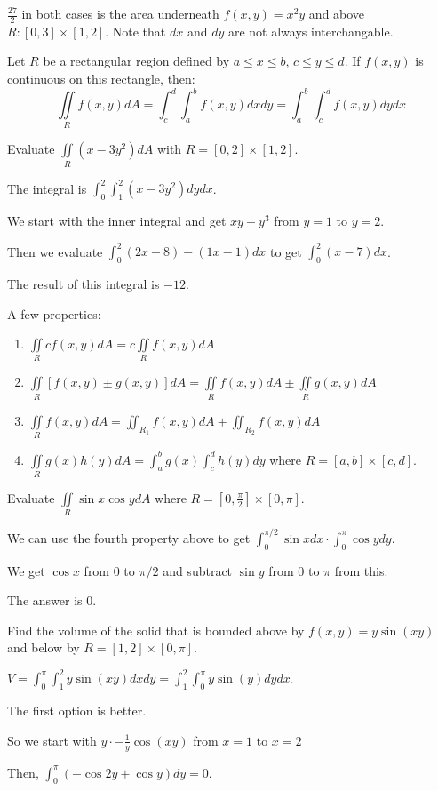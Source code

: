 \documentclass[../calc3.tex]{subfiles}
\begin{document}
$\frac{27}{2}$ in both cases is the area underneath $f(x,y)=x^2y$ and above $R:[0,3]\times [1,2]$. Note that $dx$ and $dy$ are not always interchangable.

\pagebreak
\begin{theorem}
    Let $R$ be a rectangular region defined by $a\leq x\leq b$, $c\leq y\leq d$. If $f(x,y)$ is continuous on this rectangle, then:
    \[ \iint\limits_{R} f(x,y)dA = \int_c^d \int_a^b f(x,y)dxdy = \int_a^b \int_c^d f(x,y)dydx \]
\end{theorem}

\begin{example}
    Evaluate $\iint\limits_{R} (x-3y^2)dA$ with $R=[0,2]\times [1,2]$.

    The integral is $\int_0^2 \int_1^2 (x-3y^2)dydx$.

    We start with the inner integral and get $xy-y^3$ from $y=1$ to $y=2$.

    Then we evaluate $\int_0^2 (2x-8)-(1x-1)dx$ to get $\int_0^2 (x-7)dx$.

    The result of this integral is $-12$.
\end{example}

A few properties:
\begin{enumerate}
    \item $\iint\limits_{R} cf(x,y)dA = c\iint\limits_{R} f(x,y)dA$
    \item $\iint\limits_{R} [f(x,y)\pm g(x,y)]dA = \iint\limits_{R} f(x,y)dA \pm \iint\limits_{R} g(x,y)dA$
    \item $\iint\limits_{R} f(x,y)dA = \iint_{R_1}f(x,y)dA + \iint_{R_2}f(x,y)dA$
    \item $\iint\limits_{R} g(x)h(y)dA = \int_a^b g(x)\int_c^d h(y)dy$ where $R=[a,b]\times [c,d]$.
\end{enumerate}

\begin{example}
    Evaluate $\iint\limits_{R} \sin x\cos y dA$ where $R=\left[0,\frac{\pi}{2}\right]\times [0,\pi]$.

    We can use the fourth property above to get $\int_0^{\pi/2}\sin xdx\cdot \int_0^{\pi}\cos y dy$.

    We get $\cos x$ from $0$ to $\pi/2$ and subtract $\sin y$ from $0$ to $\pi$ from this.

    The answer is $0$.
\end{example}

\begin{example}
    Find the volume of the solid that is bounded above by $f(x,y)=y\sin(xy)$ and below by $R=[1,2]\times [0,\pi]$.

    $V=\int_0^{\pi}\int_1^2 y\sin(xy)dxdy=\int_1^2 \int_0^{\pi}y\sin(y)dydx$.

    The first option is better.

    So we start with $y\cdot -\frac{1}{y}\cos(xy)$ from $x=1$ to $x=2$ 

    Then, $\int_0^{\pi}(-\cos 2y+\cos y)dy = 0$.
\end{example}
\end{document}
